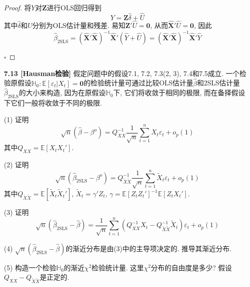 \documentclass[cn,12pt,math=mtpro2,citestyle=gb7714-2015,bibstyle=gb7714-2015,twocol,mode=simple]{elegantbook}
\newcommand{\HH}{\mathbb{H}}
\newcommand{\E}{\mathbb{E}}
\newcommand{\btls}{\hat{\beta}_{\text{2SLS}}}
\newcommand{\X}{\mathbf{X}}
\begin{document}
\begin{proof}
  将$Y$对$\mathbf{Z}$进行OLS回归得到
  $$Y=\mathbf{Z}\hat{\delta}+\hat{U}$$
  其中$\hat{\delta}$和$\hat{U}$分别为OLS估计量和残差. 易知$\mathbf{Z}'\hat{U}=\mathbf{0}$, 从而$\hat{\X}'\hat{U}=\mathbf{0}$, 因此
  $$\btls=(\hat{\X}'\hat{\X})^{-1}\hat{\X}'(\hat{Y}+\hat{U})=(\hat{\X}'\hat{\X})^{-1}\hat{\X}'\hat{Y}$$

  $\square$
\end{proof}

\textbf{7.13 [Hausman检验]} 假定问题中的假设7.1, 7.2, 7.3(2, 3), 7.4和7.5成立. 一个检验原假设$\HH_0: \E[\varepsilon_t|X_t]=\mathbf{0}$的检验统计量可通过比较OLS估计量$\hat{\beta}$和2SLS估计量$\btls$的大小来构造, 因为在原假设$\HH_0$下, 它们将收敛于相同的极限, 而在备择假设下它们一般将收敛于不同的极限.

(1) 证明
$$\sqrt{n}(\hat{\beta}-\beta^o)=Q_{XX}^{-1}\frac{1}{\sqrt{n}}\sum_{t=1}^{n}X_t\varepsilon_t+o_p(1)$$
其中$Q_{XX}=\E[X_tX_t']$.

(2) 证明
$$\sqrt{n}(\btls-\beta^o)=Q_{\tilde{X}\tilde{X}}^{-1}\frac{1}{\sqrt{n}}\sum_{t=1}^{n}\tilde{X}_t\varepsilon_t+o_p(1)$$
其中$Q_{\tilde{X}\tilde{X}}=\E[\tilde{X}_t\tilde{X}_t']$, $\tilde{X}_t=\gamma' Z_t$, $\gamma=\E[Z_tZ_t']^{-1}\E[Z_tX_t']$.

(3) 证明
$$\sqrt{n}(\btls-\hat{\beta})=\frac{1}{\sqrt{n}}\sum_{t=1}^{n}\left(Q_{XX}^{-1}X_t-Q_{\tilde{X}\tilde{X}}^{-1}\tilde{X}_t\right)\varepsilon_t+o_p(1)$$

(4) $\sqrt{n}(\btls-\hat{\beta})$的渐近分布是由(3)中的主导项决定的. 推导其渐近分布.

(5) 构造一个检验$\HH_0$的渐近$\chi^2$检验统计量. 这里$\chi^2$分布的自由度是多少? 假设$Q_{XX}-Q_{\tilde{X}\tilde{X}}$是正定的.
\end{document}
